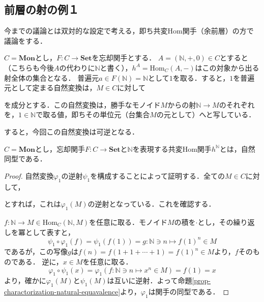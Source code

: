 \documentclass[uplatex, dvipdfmx]{jsreport}
\begin{document}
\subsection{前層の射の例１}
今までの議論とは双対的な設定で考える，即ち共変Hom関手（余前層）の方で議論をする．

$C=\mathbf{Mon}$とし，$F:C\to\mathbf{Set}$を忘却関手とする．
$A=(\mathbb{N},+,0)\in C$とすると（こちらも今後$A$の代わりに$\mathbb{N}$と書く），$h^A=\mathrm{Hom}_C(A,-)$はこの対象から出る射全体の集合となる．
普遍元$a\in F(\mathbb{N})=\mathbb{N}$として$1$を取る．すると，$1$を普遍元として定まる自然変換は，$M\in C$に対して
\begin{center}\end{center}
を成分とする．この自然変換は，勝手なモノイド$M$からの射$\mathbb{N}\to M$のそれぞれを，$1\in\mathbb{N}$で取る値，即ちその単位元（台集合$M$の元として）へと写している．

すると，今回この自然変換は可逆となる．
\begin{proposition}\rm{}
    $C=\mathbf{Mon}$とし，忘却関手$F:C\to\mathbf{Set}$と$\mathbb{N}$を表現する共変Hom関手$h^\mathbb{N}$とは，自然同型である．
\end{proposition}
\begin{proof}
    自然変換$\varphi_1$の逆射$\psi_1$を構成することによって証明する．全ての$M\in C$に対して，
    \begin{center}\end{center}
    とすれば，これは$\varphi_1(M)$の逆射となっている．これを確認する．

    $f:\mathbb{N}\to M　\in\mathrm{Hom}_C(\mathbb{N},M)$を任意に取る．モノイド$M$の積を$\cdot$とし，その繰り返しを冪として表すと，
    $$\psi_1\circ\varphi_1(f)=\psi_1(f(1))=g:\mathbb{N}\ni n \mapsto f(1)^n \in M$$
    であるが，この写像$g$は$f(n)=f(1+1+\cdots +1)=f(1)^n\in M$より，$f$そのものである．
    逆に，$x\in M$を任意に取る．
    $$\varphi_1\circ\psi_1(x)=\varphi_1(f:\mathbb{N}\ni n\mapsto x^n\in M)=f(1)=x$$
    より，確かに$\varphi_1(M)$と$\psi_1(M)$は互いに逆射．よって命題\ref{prop-charactorization-natural-equavalence}より，$\varphi_1$は関手の同型である．
\end{proof}
\end{document}
